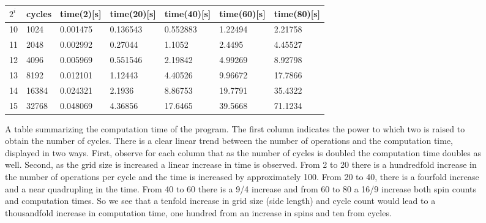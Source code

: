 \documentclass[11pt,a4paper]{article}
\begin{document}
\begin{figure}
\centering
\begin{tabular}{| l | l | l | l | l | l | l |}
\hline
$2^i$     &       cycles   & 	time(2)[s]		&time(20)[s]	&time(40)[s]&	time(60)[s]&time(80)[s] 	\\ \hline	
10    &       1024   &   0.001475  &  0.136543   & 0.552883	&1.22494 	&	2.21758 \\ \hline
11    &       2048   &   0.002992  &  0.27044    &	1.1052 	&	2.4495 		&	4.45527 \\ \hline
12    &       4096   &   0.005969  &  0.551546   &	2.19842	&	4.99269 	&	8.92798 \\ \hline
13    &       8192   &   0.012101  & 	1.12443   &  4.40526 &	9.96672		&	17.7866\\ \hline
14    &      16384   &   0.024321  &  2.1936 	&	8.86753 &	19.7791 	&	35.4322 \\ \hline
15    &      32768   &   0.048069  &  4.36856	&	17.6465  &	39.5668 	&	71.1234 \\ \hline
\end{tabular}
\caption{A table summarizing the computation time of the program. The first column indicates the power to which two is raised to obtain the number of cycles. There is a clear linear trend between the number of operations and the computation time, displayed in two ways. First, observe for each column that as the number of cycles is doubled the computation time doubles as well. Second, as the grid size is increased a linear increase in time is observed. From 2 to 20 there is a hundredfold increase in the number of operations per cycle and the time is increased by approximately 100. From 20 to 40, there is a fourfold increase and a near quadrupling in the time. From 40 to 60 there is a 9/4 increase and from 60 to 80 a 16/9 increase both spin counts and computation times. So we see that a tenfold increase in grid size (side length) and cycle count would lead to a thousandfold increase in computation time, one hundred from an increase in spins and ten from cycles.}
\end{figure}
\end{document}
